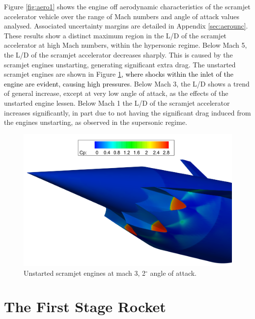 Figure \ref{fig:aero1} shows the engine off aerodynamic characteristics of the scramjet accelerator vehicle over the range of Mach numbers and angle of attack values analysed. Associated uncertainty margins are detailed in Appendix \ref{sec:aerounc}.
These results show a distinct maximum region in the L/D of the scramjet accelerator at high Mach numbers, within the hypersonic regime. Below Mach 5, the L/D of the scramjet accelerator decreases sharply. This is caused by the scramjet engines unstarting, generating significant extra drag. The unstarted scramjet engines are shown in Figure \ref{fig:Unstart}\textcolor{black}{, where shocks within the inlet of the engine are evident, causing high pressures}. Below Mach 3,  the L/D shows a trend of general increase, except at very low angle of attack, as the effects of the unstarted engine lessen. Below Mach 1 the L/D of the scramjet accelerator increases significantly, in part due to not having the significant drag induced from the engines unstarting, as observed in the supersonic regime.  

\begin{figure}[ht]
	\centering
	\includegraphics[width=0.7\linewidth]{figures/3_vehicle_design/Unstart}
	\caption{Unstarted scramjet engines at mach 3, 2$^\circ$ angle of attack.}
	\label{fig:Unstart}
\end{figure}


\section{The First Stage Rocket}\label{sec:firststage}



